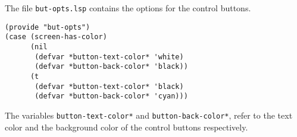 The file {\tt but-opts.lsp} contains the options for the control
buttons. 

\begin{verbatim}
(provide "but-opts")
(case (screen-has-color)
      (nil
       (defvar *button-text-color* 'white)
       (defvar *button-back-color* 'black))
      (t
       (defvar *button-text-color* 'black)
       (defvar *button-back-color* 'cyan)))
\end{verbatim}
The variables {\tt *button-text-color*} and {\tt *button-back-color*}, 
refer to the text color and the background color of the control
buttons respectively.

